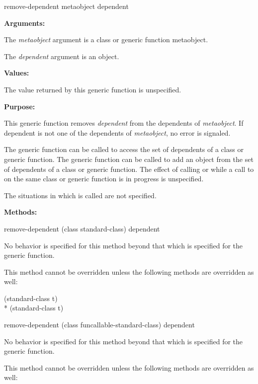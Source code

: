 \begin{defun}
remove-dependent metaobject dependent

\textbf{Arguments:}

The \emph{metaobject} argument is a class or generic function metaobject.

The \emph{dependent} argument is an object.

\textbf{Values:}

The value returned by this generic function is unspecified.

\textbf{Purpose:}

This generic function removes \emph{dependent} from the dependents of
\emph{metaobject}. If dependent is not one of the dependents of
\emph{metaobject}, no error is signaled.

The generic function  can be called to access the set of
dependents of a class or generic function. The generic function
 can be called to add an object from the set of dependents of
a class or generic function. The effect of calling  or
 while a call to  on the same class or
generic function is in progress is unspecified.

The situations in which  is called are not specified.

\textbf{Methods:}

\begin{defun}
remove-dependent (class standard-class) dependent

No behavior is specified for this method beyond that which is specified for the generic function.

This method cannot be overridden unless the following methods are overridden as well:

\begin{tabbing}
     (standard-class t)\\*
     (standard-class t) 
\end{tabbing}
\end{defun}

\begin{defun}
remove-dependent (class funcallable-standard-class) dependent

No behavior is specified for this method beyond that which is specified for the generic function.

This method cannot be overridden unless the following methods are overridden as well:


\end{defun}
\end{defun}
